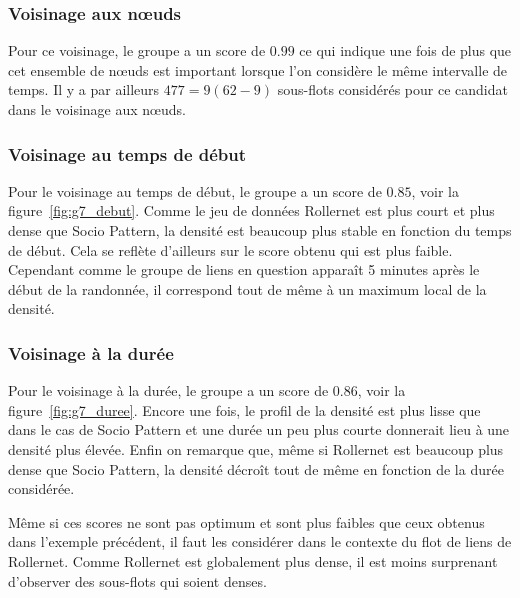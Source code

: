 \subsubsection*{Voisinage aux n\oe{}uds}
Pour ce voisinage, le groupe a un score de $0.99$ ce qui indique une fois de plus que cet ensemble de n\oe{}uds est important lorsque l'on considère le même intervalle de temps.
Il y a par ailleurs $477=9(62-9)$ sous-flots considérés pour ce candidat dans le voisinage aux n\oe{}uds.

\subsubsection*{Voisinage au temps de début}
Pour le voisinage au temps de début, le groupe a un score de $0.85$, voir la figure~\ref{fig:g7_debut}.
Comme le jeu de données Rollernet est plus court et plus dense que Socio Pattern, la densité est beaucoup plus stable en fonction du temps de début.
Cela se reflète d'ailleurs sur le score obtenu qui est plus faible.
Cependant comme le groupe de liens en question apparaît 5 minutes après le début de la randonnée, il correspond tout de même à un maximum local de la densité.


\subsubsection*{Voisinage à la durée}
Pour le voisinage à la durée, le groupe a un score de $0.86$, voir la figure~\ref{fig:g7_duree}.
Encore une fois, le profil de la densité est plus lisse que dans le cas de Socio Pattern et une durée un peu plus courte donnerait lieu à une densité plus élevée. 
Enfin on remarque que, même si Rollernet est beaucoup plus dense que Socio Pattern, la densité décroît tout de même en fonction de la durée considérée.

\bigskip

Même si ces scores ne sont pas optimum et sont plus faibles que ceux obtenus dans l'exemple précédent, il faut les considérer dans le contexte du flot de liens de Rollernet.
Comme Rollernet est globalement plus dense, il est moins surprenant d'observer des sous-flots qui soient denses.
 

